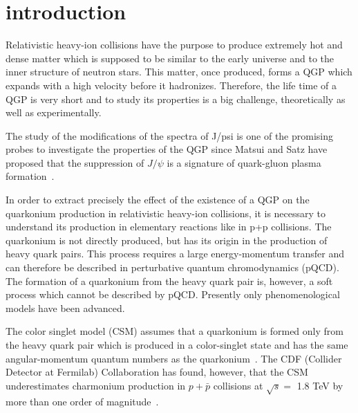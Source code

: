 \documentclass[twocolumn,aps,superscriptaddress,showpacs,nofootinbib,floatfix]{revtex4}
\begin{document}

\keywords{}

\maketitle

\section{introduction}



Relativistic heavy-ion collisions have the purpose to produce extremely hot and dense matter which is supposed to be similar to the early universe and to the inner structure of neutron stars. This matter, once produced, forms a QGP which expands with a high velocity before it hadronizes. Therefore, the life time of a QGP is very short and to study its properties is a big challenge, theoretically as well as experimentally.

The study of the modifications of the spectra of J/psi is one of the promising probes to investigate the properties of the QGP since
Matsui and Satz have proposed that the suppression of $J/\psi$ is a signature of quark-gluon plasma formation~\cite{Matsui:1986dk,Zhao:2007hh,Linnyk:2008hp,Liu:2009gx,Song:2011xi,Zhou:2014kka}.

In order to extract  precisely the effect of the existence of a QGP on the quarkonium production in relativistic heavy-ion collisions, it is necessary to understand its production in elementary reactions like in p+p collisions. The quarkonium is not directly produced, but has its origin in the production of heavy quark pairs. This process requires a large energy-momentum transfer and can therefore be described in perturbative quantum chromodynamics (pQCD). The formation of a quarkonium from the heavy quark pair is, however, a soft process which cannot be described by pQCD. Presently only phenomenological models have been advanced.

The color singlet model (CSM) assumes that a quarkonium is formed only from the heavy quark pair which is produced in a color-singlet state and has the same angular-momentum quantum numbers as the quarkonium~\cite{Chang:1979nn,Berger:1980ni,Baier:1983va}. The CDF (Collider Detector at Fermilab) Collaboration has found, however,  that the CSM underestimates charmonium production in $p+\bar{p}$ collisions at $\sqrt{s}=$ 1.8 TeV by more than one order of magnitude~\cite{Abe:1997jz,Abe:1997yz}.
\end{document}
